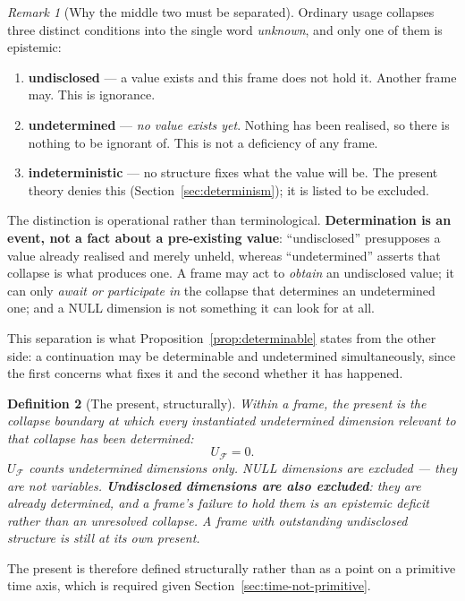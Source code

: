 \documentclass[11pt,a4paper]{article}
\newtheorem{definition}{Definition}[section]
\theoremstyle{remark}\newtheorem{remark}[definition]{Remark}
\begin{document}
\begin{remark}[Why the middle two must be separated]\label{rem:undetermined-vs-undisclosed}
Ordinary usage collapses three distinct conditions into the single word \emph{unknown}, and only one of them is epistemic:
\begin{enumerate}[leftmargin=*]
\item \textbf{undisclosed} --- a value exists and this frame does not hold it. Another frame may. This is ignorance.
\item \textbf{undetermined} --- \emph{no value exists yet}. Nothing has been realised, so there is nothing to be ignorant of. This is not a deficiency of any frame.
\item \textbf{indeterministic} --- no structure fixes what the value will be. The present theory denies this (Section~\ref{sec:determinism}); it is listed to be excluded.
\end{enumerate}
The distinction is operational rather than terminological. \textbf{Determination is an event, not a fact about a pre-existing value}: ``undisclosed'' presupposes a value already realised and merely unheld, whereas ``undetermined'' asserts that collapse is what produces one. A frame may act to \emph{obtain} an undisclosed value; it can only \emph{await or participate in} the collapse that determines an undetermined one; and a NULL dimension is not something it can look for at all.

This separation is what Proposition~\ref{prop:determinable} states from the other side: a continuation may be determinable and undetermined simultaneously, since the first concerns what fixes it and the second whether it has happened.
\end{remark}

\begin{definition}[The present, structurally]\label{def:present}
Within a frame, the present is the collapse boundary at which every instantiated \emph{undetermined} dimension relevant to that collapse has been determined:
\[
\boxed{U_{\mathcal F}=0.}
\]
$U_{\mathcal F}$ counts undetermined dimensions only. NULL dimensions are excluded --- they are not variables. \textbf{Undisclosed dimensions are also excluded}: they are already determined, and a frame's failure to hold them is an epistemic deficit rather than an unresolved collapse. A frame with outstanding undisclosed structure is still at its own present.
\end{definition}
The present is therefore defined structurally rather than as a point on a primitive time axis, which is required given Section~\ref{sec:time-not-primitive}.
\end{document}
